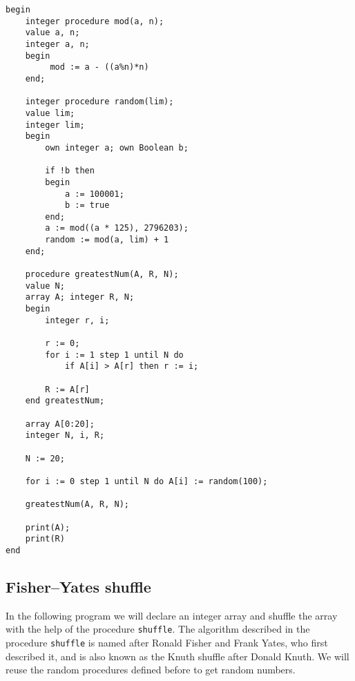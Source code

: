 \documentclass{article}
\begin{document}
\begin{lstlisting}[language={[60]algol}]
begin
    integer procedure mod(a, n);
    value a, n;
    integer a, n;
    begin
         mod := a - ((a%n)*n)
    end;
 
    integer procedure random(lim);
    value lim;
    integer lim;
    begin
        own integer a; own Boolean b;
        
        if !b then
        begin
            a := 100001;
            b := true
        end;
        a := mod((a * 125), 2796203);
        random := mod(a, lim) + 1
    end;

    procedure greatestNum(A, R, N);
    value N;
    array A; integer R, N;
    begin
        integer r, i;
        
        r := 0;
        for i := 1 step 1 until N do
            if A[i] > A[r] then r := i;
        
        R := A[r]
    end greatestNum;
    
    array A[0:20];
    integer N, i, R;
    
    N := 20;
    
    for i := 0 step 1 until N do A[i] := random(100);
        
    greatestNum(A, R, N);
    
    print(A);
    print(R)
end
\end{lstlisting}

\subsection{Fisher–Yates shuffle}
In the following program we will declare an integer array and shuffle the array with the help of the procedure \texttt{shuffle}. The algorithm described in the procedure \texttt{shuffle} is named after Ronald Fisher and Frank Yates, who first described it, and is also known as the Knuth shuffle after Donald Knuth. We will reuse the random procedures defined before to get random numbers.
\end{document}
